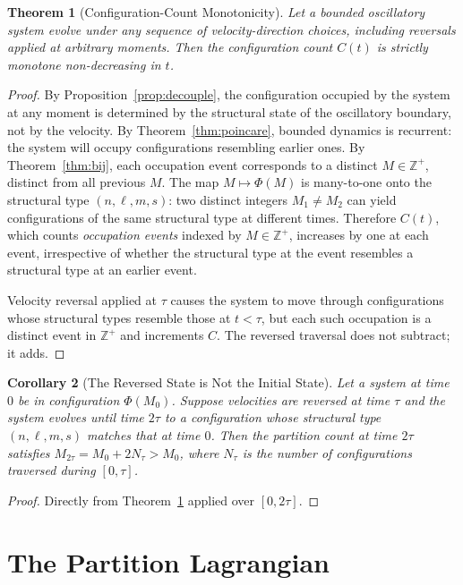 \documentclass[twocolumn,10pt,a4paper]{article}
\theoremstyle{thmstyle}
\newtheorem{theorem}{Theorem}[section]
\newtheorem{corollary}[theorem]{Corollary}
\theoremstyle{definition}
\theoremstyle{remark}
\newcommand{\Zp}{\mathbb{Z}^{+}}
\newcommand{\PhiMap}{\varPhi}
\begin{document}
\begin{theorem}[Configuration-Count Monotonicity]
\label{thm:mono}
Let a bounded oscillatory system evolve under any sequence of
velocity-direction choices, including reversals applied at arbitrary
moments. Then the configuration count $C(t)$ is strictly monotone
non-decreasing in $t$.
\end{theorem}

\begin{proof}
By Proposition~\ref{prop:decouple}, the configuration occupied by the
system at any moment is determined by the structural state of the
oscillatory boundary, not by the velocity. By
Theorem~\ref{thm:poincare}, bounded dynamics is recurrent: the system
will occupy configurations resembling earlier ones. By
Theorem~\ref{thm:bij}, each occupation event corresponds to a distinct
$M\in\Zp$, distinct from all previous $M$. The map
$M\mapsto\PhiMap(M)$ is many-to-one onto the structural type
$(n,\ell,m,s)$: two distinct integers $M_{1}\neq M_{2}$ can yield
configurations of the same structural type at different times.
Therefore $C(t)$, which counts \emph{occupation events} indexed by
$M\in\Zp$, increases by one at each event, irrespective of whether
the structural type at the event resembles a structural type at an
earlier event.

Velocity reversal applied at $\tau$ causes the system to move through
configurations whose structural types resemble those at $t<\tau$, but
each such occupation is a distinct event in $\Zp$ and increments
$C$. The reversed traversal does not subtract; it adds.
\end{proof}

\begin{corollary}[The Reversed State is Not the Initial State]
\label{cor:notinitial}
Let a system at time $0$ be in configuration $\PhiMap(M_{0})$. Suppose
velocities are reversed at time $\tau$ and the system evolves until
time $2\tau$ to a configuration whose structural type
$(n,\ell,m,s)$ matches that at time $0$. Then the partition count at
time $2\tau$ satisfies $M_{2\tau}=M_{0}+2N_{\tau}>M_{0}$, where
$N_{\tau}$ is the number of configurations traversed during $[0,\tau]$.
\end{corollary}

\begin{proof}
Directly from Theorem~\ref{thm:mono} applied over $[0,2\tau]$.
\end{proof}

\section{The Partition Lagrangian}
\label{sec:lagrangian}
\end{document}
